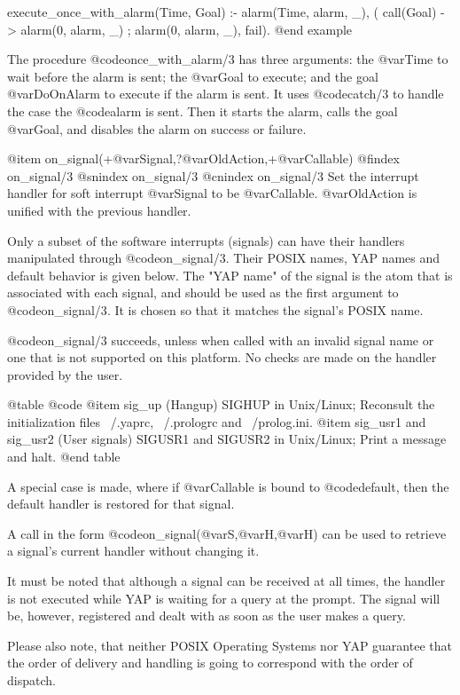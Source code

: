 {{{{{{execute_once_with_alarm(Time, Goal) :-
        alarm(Time, alarm, _),
        ( call(Goal) -> alarm(0, alarm, _) ; alarm(0, alarm, _), fail).
@end example

The procedure @code{once_with_alarm/3} has three arguments:
the @var{Time} to wait before the alarm is
sent; the @var{Goal} to execute; and the goal @var{DoOnAlarm} to execute
if the alarm is sent. It uses @code{catch/3} to handle the case the
@code{alarm} is sent. Then it starts the alarm, calls the goal
@var{Goal}, and disables the alarm on success or failure.

@item on_signal(+@var{Signal},?@var{OldAction},+@var{Callable})
@findex on_signal/3
@snindex on_signal/3
@cnindex on_signal/3
Set the interrupt handler for soft interrupt @var{Signal} to be
@var{Callable}. @var{OldAction} is unified with the previous handler.

Only a subset of the software interrupts (signals) can have their
handlers manipulated through @code{on_signal/3}.
Their POSIX names, YAP names and default behavior is given below.
The "YAP name" of the signal is the atom that is associated with
each signal, and should be used as the first argument to
@code{on_signal/3}. It is chosen so that it matches the signal's POSIX
name.

@code{on_signal/3} succeeds, unless when called with an invalid
signal name or one that is not supported on this platform. No checks
are made on the handler provided by the user.

@table @code
@item sig_up (Hangup)
  SIGHUP in Unix/Linux; Reconsult the initialization files
  ~/.yaprc, ~/.prologrc and ~/prolog.ini.
@item sig_usr1 and sig_usr2 (User signals)
  SIGUSR1 and SIGUSR2 in Unix/Linux; Print a message and halt.
@end table

A special case is made, where if @var{Callable} is bound to
@code{default}, then the default handler is restored for that signal.

A call in the form @code{on_signal(@var{S},@var{H},@var{H})} can be used
to retrieve a signal's current handler without changing it.

It must be noted that although a signal can be received at all times,
the handler is not executed while YAP is waiting for a query at the
prompt. The signal will be, however, registered and dealt with as soon
as the user makes a query.

Please also note, that neither POSIX Operating Systems nor YAP guarantee
that the order of delivery and handling is going to correspond with the
order of dispatch.

}}}}}}
